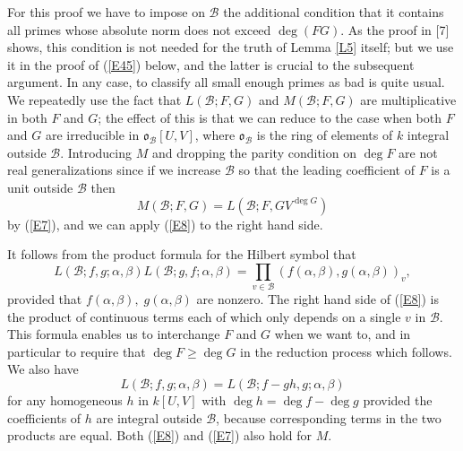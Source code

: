 \documentclass[12pt]{article}
\def\fo{{\mathfrak o}}
\def\ga{{\alpha}}
\def\gb{{\beta}}
\def\sB{{\mathcal B}}
\def\beq{\begin{equation} \label}
\begin{document}
For this proof we have to impose on $\sB$ the additional condition
that it contains all primes whose absolute norm does not exceed $\deg(FG)$. As
the proof in [7] shows, this condition is not needed for the truth of Lemma
\ref{L5} itself; but we use it in the proof of (\ref{E45})
below, and the latter is crucial to the subsequent argument. In any case, to
classify all small enough primes as bad is quite usual. We
repeatedly use the fact that $L(\sB;F,G)$ and $M(\sB;F,G)$ are multiplicative
in both $F$ and $G$; the effect of this is that we can reduce to the case when
both $F$ and $G$ are irreducible in $\fo_\sB[U,V]$, where $\fo_\sB$ is the
ring of elements of $k$ integral outside $\sB$. Introducing $M$ and
dropping the parity condition on $\deg F$ are not real generalizations
since if we increase $\sB$ so that
the leading coefficient of $F$ is a unit outside $\sB$ then
\beq{E47} M(\sB;F,G)=L(\sB;F,GV^{\deg G}) \end{equation}
by (\ref{E7}), and we can apply (\ref{E8}) to the right hand side.

It follows from the product formula for the Hilbert symbol that
\beq{E8} L(\sB;f,g;\ga,\gb)L(\sB;g,f;\ga,\gb)=
\prod_{v\in\sB}(f(\ga,\gb),g(\ga,\gb))_v, \end{equation}
provided that $f(\ga,\gb),\;g(\ga,\gb)$ are nonzero.
The right hand side of (\ref{E8}) is the product of continuous
terms each of which only depends on a single $v$ in $\sB$. This formula
enables us to interchange $F$ and $G$ when we want to, and in particular to
require that $\deg F\geq\deg G$ in the reduction process which follows. We
also have
\beq{E7} L(\sB;f,g;\ga,\gb)=L(\sB;f-gh,g;\ga,\gb) \end{equation}
for any homogeneous $h$ in $k[U,V]$ with $\deg h=\deg f-\deg g$ provided the
coefficients of $h$ are integral outside $\sB$, because
corresponding terms in the two products are equal. Both (\ref{E8}) and
(\ref{E7}) also hold for $M$.
\end{document}
